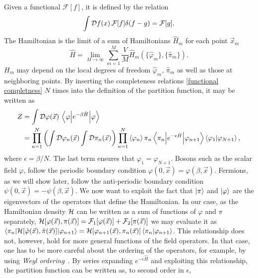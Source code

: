 Given a functional $\mathcal{F}[f]$, it is defined by the relation
%
\begin{equation}
    \int \mathcal D f(x)\, \mathcal{F}[f] \delta(f - g) = \mathcal{F}[g].
\end{equation}
%
The Hamiltonian is the limit of a sum of Hamiltonians $\hat H_m$ for each point $\vec x_m$
%
\begin{equation}
    \hat H
    = \lim_{M \rightarrow \infty} \sum_{m=1}^M 
    \frac{V}{M} \hat H_m(\{\hat \varphi_m\}, \{\hat \pi_m\}).
\end{equation}
$H_m$ may depend on the local degrees of freedom $\hat \varphi_m, \, \hat \pi_m$ as well as those at neighboring points.
By inserting the completeness relations \autoref{functional completness} $N$ times into the definition of the partition function, it may be written as
%
\begin{align}
    \nonumber
    Z
    &  = \int \mathcal D\varphi(\vec x) \, \left\langle \varphi {\left| e^{- \beta \hat H} \right|} \varphi \right\rangle
    \\ & 
    = 
    \prod_{n=1}^N
    \left(
        \int \mathcal D \varphi_n (\vec x) \int \mathcal D \pi_n(\vec x)
    \right) 
    \prod_{n=1}^N  \braket{\varphi_n}{\pi_n}
    \left\langle \pi_n {\left| e^{- \epsilon \hat H} \right|} \varphi_{n+1} \right\rangle \braket{\varphi_{1} | \varphi_{N+1}},
\end{align}
%
where $\epsilon = \beta / N$. The last term ensures that $\varphi_1 = \varphi_{N+1}$.
Bosons such as the scalar field $\varphi$, follow the periodic boundary condition $\varphi(0, \vec x) = \varphi(\beta, \vec x)$.
Fermions, as we will show later, follow the anti-periodic boundary condition $\psi(0, \vec x) = -\psi(\beta, \vec x)$.
We now want to exploit the fact that $\ket{\pi}$ and $\ket{\varphi}$ are the eigenvectors of the operators that define the Hamiltonian.
In our case, as the Hamiltonian density $\mathcal{H}$ can be written as a sum of functions of $\varphi$ and $\pi$ separately, $\mathcal{H}[\varphi(\vec x), \pi(\vec x)] = \mathcal{F}_1[\varphi(\vec x)] + \mathcal{F}_2[\pi(\vec x)]$ we may evaluate it as $\left\langle \pi_n {\left| \mathcal{H}[\hat \varphi(\vec x), \hat \pi(\vec x)] \right|} \varphi_{n+1} \right\rangle = \mathcal{H}[\varphi_{n+1}(\vec x), \pi_n(\vec x)] \braket{\pi_n | \varphi_{n+1}}$.
This relationship does not, however, hold for more general functions of the field operators.
In that case, one has to be more careful about the ordering of the operators, for example, by using \emph{Weyl ordering}~\cite{peskinIntroductionQuantumField1995}.
By series expanding $e^{-\epsilon \hat H}$ and exploiting this relationship, the partition function can be written as, to second order in $\epsilon$,
